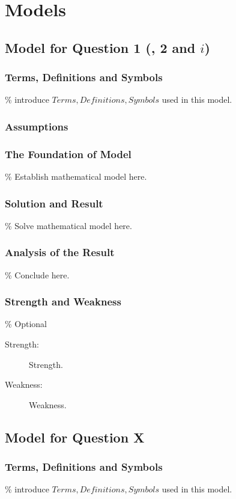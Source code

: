 \documentclass{apmcmthesis}
\begin{document}
\section{Models}

\subsection{Model for Question 1 (, 2 and $i$)}

\subsubsection{Terms, Definitions and Symbols}
\% introduce $Terms, Definitions, Symbols$ used in this model.

\subsubsection{Assumptions}


\subsubsection{The Foundation of Model}
\% Establish mathematical model here.


\subsubsection{Solution and Result}
\% Solve mathematical model here.


\subsubsection{Analysis of the Result}
\% Conclude here.


\subsubsection{Strength and Weakness}
\% Optional
\begin{description}
\item[Strength:] Strength.
\item[Weakness:] Weakness.
\end{description}


\subsection{Model for Question X}

\subsubsection{Terms, Definitions and Symbols}
\% introduce $Terms, Definitions, Symbols$ used in this model.
\end{document}
